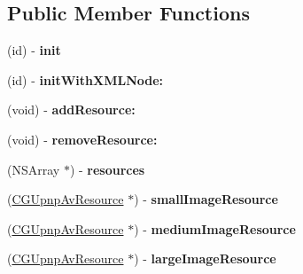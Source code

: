 \subsection*{Public Member Functions}
\begin{DoxyCompactItemize}
\item 
\hypertarget{interface_c_g_upnp_av_item_a59e187111297393e3cc8878808c897d8}{(id) -\/ {\bfseries init}}\label{interface_c_g_upnp_av_item_a59e187111297393e3cc8878808c897d8}

\item 
\hypertarget{interface_c_g_upnp_av_item_a3a8476965524f5abe9f795ad153a120f}{(id) -\/ {\bfseries init\-With\-X\-M\-L\-Node\-:}}\label{interface_c_g_upnp_av_item_a3a8476965524f5abe9f795ad153a120f}

\item 
\hypertarget{interface_c_g_upnp_av_item_a157d4a80d72c71df3cb276466efc34e0}{(void) -\/ {\bfseries add\-Resource\-:}}\label{interface_c_g_upnp_av_item_a157d4a80d72c71df3cb276466efc34e0}

\item 
\hypertarget{interface_c_g_upnp_av_item_a34dfafec069a23887b1feef73280f41f}{(void) -\/ {\bfseries remove\-Resource\-:}}\label{interface_c_g_upnp_av_item_a34dfafec069a23887b1feef73280f41f}

\item 
\hypertarget{interface_c_g_upnp_av_item_adeec8d34418f421adf0ea3066d18e6f4}{(N\-S\-Array $\ast$) -\/ {\bfseries resources}}\label{interface_c_g_upnp_av_item_adeec8d34418f421adf0ea3066d18e6f4}

\item 
\hypertarget{interface_c_g_upnp_av_item_a6a073bdcde048cc8c0157a5daf0d5164}{(\hyperlink{interface_c_g_upnp_av_resource}{C\-G\-Upnp\-Av\-Resource} $\ast$) -\/ {\bfseries small\-Image\-Resource}}\label{interface_c_g_upnp_av_item_a6a073bdcde048cc8c0157a5daf0d5164}

\item 
\hypertarget{interface_c_g_upnp_av_item_a434b8b61f71e78f207918ae9645c3041}{(\hyperlink{interface_c_g_upnp_av_resource}{C\-G\-Upnp\-Av\-Resource} $\ast$) -\/ {\bfseries medium\-Image\-Resource}}\label{interface_c_g_upnp_av_item_a434b8b61f71e78f207918ae9645c3041}

\item 
\hypertarget{interface_c_g_upnp_av_item_a624bae8418cf996bbceda9de1d160336}{(\hyperlink{interface_c_g_upnp_av_resource}{C\-G\-Upnp\-Av\-Resource} $\ast$) -\/ {\bfseries large\-Image\-Resource}}\label{interface_c_g_upnp_av_item_a624bae8418cf996bbceda9de1d160336}


\end{DoxyCompactItemize}
